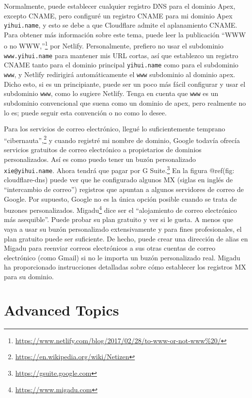 \documentclass[12pt,]{krantz}
\renewcommand{\href}[2]{#2\footnote{\url{#1}}}
\theoremstyle{definition}
\theoremstyle{definition}
\theoremstyle{definition}
\theoremstyle{remark}
\begin{document}
Normalmente, puede establecer cualquier registro DNS para el dominio
Apex, excepto CNAME, pero configuré un registro CNAME para mi dominio
Apex \texttt{yihui.name}, y esto se debe a que Cloudflare admite el
aplanamiento CNAME. Para obtener más información sobre este tema, puede
leer la publicación
\href{https://www.netlify.com/blog/2017/02/28/to-www-or-not-www\%20/}{``WWW
o no WWW,''} por Netlify. Personalmente, prefiero no usar el subdominio
\texttt{www.yihui.name} para mantener mis URL cortas, así que establezco
un registro CNAME tanto para el dominio principal \texttt{yihui.name}
como para el subdominio \texttt{www}, y Netlify redirigirá
automáticamente el \texttt{www} subdominio al dominio apex. Dicho esto,
si es un principiante, puede ser un poco más fácil configurar y usar el
subdominio \texttt{www}, como lo sugiere Netlify. Tenga en cuenta que
\texttt{www} es un subdominio convencional que suena como un dominio de
apex, pero realmente no lo es; puede seguir esta convención o no como lo
desee.

Para los servicios de correo electrónico, llegué lo suficientemente
temprano \href{https://en.wikipedia.org/wiki/Netizen}{``cibernauta'',} y
cuando registré mi nombre de dominio, Google todavía ofrecía servicios
gratuitos de correo electrónico a propietarios de dominios
personalizados. Así es como puedo tener un buzón personalizado
\texttt{xie@yihui.name}. Ahora tendrá que pagar por
\href{https://gsuite.google.com}{G Suite.} En la figura @ref(fig:
cloudflare-dns) puede ver que he configurado algunos MX (siglas en
inglés de ``intercambio de correo'') registros que apuntan a algunos
servidores de correo de Google. Por supuesto, Google no es la única
opción posible cuando se trata de buzones personalizados.
\href{https://www.migadu.com}{Migadu} dice ser el ``alojamiento de
correo electrónico más asequible''. Puede probar su plan gratuito y ver
si le gusta. A menos que vaya a usar su buzón personalizado
extensivamente y para fines profesionales, el plan gratuito puede ser
suficiente. De hecho, puede crear una dirección de alias en Migadu para
reenviar correos electrónicos a sus otras cuentas de correo electrónico
(como Gmail) si no le importa un buzón personalizado real. Migadu ha
proporcionado instrucciones detalladas sobre cómo establecer los
registros MX para su dominio.

\hypertarget{advanced-topics}{%
\chapter{Advanced Topics}\label{advanced-topics}}
\end{document}
